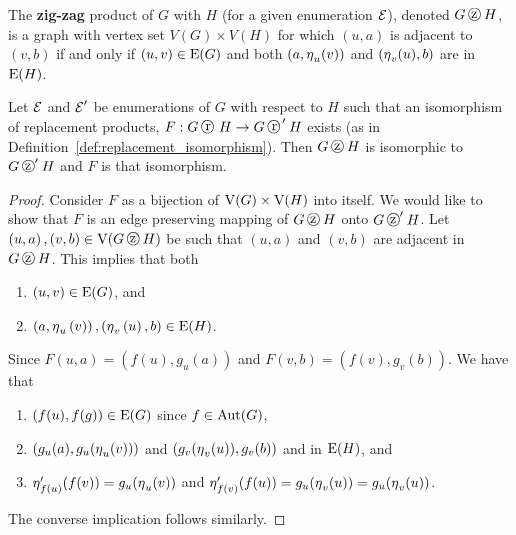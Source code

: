 \begin{definition}
\label{def:zig_zag:old}
The {\bf zig-zag} product of $G$ with $H$ (for a given enumeration $\operatorname{\mathcal{E}}$), denoted $G \zigzag H$, is a graph with vertex set $V(G) \times V(H)$ for which $\left( u, a \right)$ is adjacent to $ \left( v, b \right)$ if and only if $\left(u,v\right) \in \mathrm{E}(G) $ and both $\left(a, \operatorname{\eta}_{u}(v) \right)$ and $\left(\operatorname{\eta}_{v}(u), b\right)$ are in $\mathrm{E}(H) $.
\end{definition}


\begin{theorem}
\label{def:isomorphic_replacement:zigzag}
Let $\operatorname{\mathcal{E}}$ and $\operatorname{\mathcal{E}}^{\prime}$ be enumerations of $G$ with respect to $H$ such that an isomorphism of replacement products, $F: G \replacement H \to G \replacement^{\prime} H$ exists (as in Definition~\ref{def:replacement_isomorphism}). Then $G \zigzag H$ is isomorphic to $G \zigzag^{\prime} H$ and $F$ is that isomorphism. 
\end{theorem}
\begin{proof}

Consider $F$ as a bijection of $\mathrm{V}(G) \times \mathrm{V}(H)$ into itself. We would like to show that $F$ is an edge preserving mapping of $G \zigzag H$ onto $G \zigzag^{\prime} H$. Let $\left(u, a \right), \left(v, b \right) \in \vertS{G \zigzag H }$ be such that $\left(u, a \right)$ and $\left(v, b \right) $ are adjacent in $G \zigzag H$. This implies that both
\begin{enumerate}
\item $\left(u,v\right) \in \mathrm{E}(G) $, and
\item $\left(a, \operatorname{\eta}_{u}\left( v\right)\right), \left(\operatorname{\eta}_{v}\left(u\right), b\right) \in \mathrm{E}(H) $.
\end{enumerate}
Since $F(u,a) = \left( f(u), g_{u}(a) \right)$ and $F(v,b) = \left( f(v), g_{v}(b) \right)$. We have that
\begin{enumerate}
\item $\left( f(u), f(g) \right) \in \mathrm{E}(G) $ since $f \in \operatorname{\mathrm{Aut}}(G)$,
\item $\left(g_u(a), g_u(\operatorname{\eta}_{u}(v)) \right)$ and $\left(g_v(\operatorname{\eta}_{v}(u)), g_v(b) \right)$ and in $\mathrm{E}(H) $, and
\item  $\operatorname{\eta}^{\prime}_{f(u)}(f(v)) = g_u( \operatorname{\eta}_u(v) )$ and $\operatorname{\eta}^{\prime}_{f(v)} (f(u)) = g_u( \operatorname{\eta}_v(u)) = g_u(\operatorname{\eta}_{v}(u))$.
\end{enumerate}
The converse implication follows similarly.
\end{proof}

